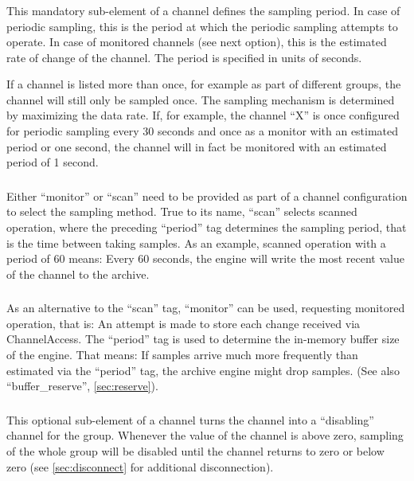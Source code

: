 \subsubsection{} \label{sec:period}
This mandatory sub-element of a channel defines the sampling period.
In case of periodic sampling, this is the period at which the periodic
sampling attempts to operate. In case of monitored channels (see next
option), this is the estimated rate of change of the channel.
The period is specified in units of seconds.

If a channel is listed more than once, for example as part of
different groups, the channel will still only be sampled once. The
sampling mechanism is determined by maximizing the data rate. If, for
example, the channel ``X'' is once configured for periodic sampling
every 30 seconds and once as a monitor with an estimated period or one
second, the channel will in fact be monitored with an estimated period
of 1 second.

\subsubsection{}
Either ``monitor'' or ``scan'' need to be provided as part of a
channel configuration to select the sampling method.  
True to its name, ``scan'' selects scanned operation, where the preceding
``period'' tag determines the sampling period, that is the time
between taking samples.
As an example, scanned operation with a period of 60 means: Every 60
seconds, the engine will write the most recent value of the channel to
the archive.

\subsubsection{}
As an alternative to the ``scan'' tag, ``monitor'' can be used,
requesting monitored operation, that is: An attempt is made to store
each change received via ChannelAccess. The ``period'' tag is used to
determine the in-memory buffer size of the engine. That means: If
samples arrive much more frequently than estimated via the ``period''
tag, the archive engine might drop samples. (See also
``buffer\_reserve'', \ref{sec:reserve}).


\subsubsection{} \label{sec:disable}
This optional sub-element of a channel turns the channel into a
``disabling'' channel for the group. Whenever the value of the channel
is above zero, sampling of the whole group will be disabled until the
channel returns to zero or below zero
(see \ref{sec:disconnect} for additional disconnection).


